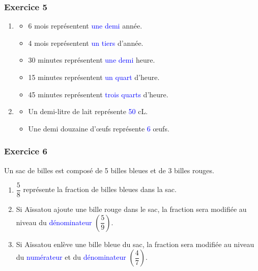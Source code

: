\documentclass[xcolor={dvipsnames}]{beamer}
\begin{document}
\begin{frame}
	\frametitle{Exercice 5}
	\begin{enumerate}[a]
		\item \begin{itemize}
			\item {\Large 6 mois représentent \pause \textcolor{blue}{une demi} année.}
			\item {\Large 4 mois représentent \pause \textcolor{blue}{un tiers} d'année.}
			\item {\Large 30 minutes représentent \pause \textcolor{blue}{une demi} heure.}
			\item {\Large 15 minutes représentent \pause \textcolor{blue}{un quart} d'heure.}
			\item {\Large  45 minutes représentent \pause \textcolor{blue}{trois quarts} d'heure.}
		\end{itemize}
		
		\vspace*{2cm}
		
		\item \begin{itemize}
			\item {\Large Un demi-litre de lait représente \pause \textcolor{blue}{50} cL.}
			\item {\Large Une demi douzaine d'\oe ufs représente \pause \textcolor{blue}{6} \oe ufs.}
		\end{itemize}
	\end{enumerate}
\end{frame}

\begin{frame}
	\frametitle{Exercice 6}
	
	Un sac de billes est composé de 5 billes bleues et de 3 billes rouges.
	
	\begin{enumerate}[a]
		\item  $\dfrac{5}{8}$ représente \pause la fraction de billes bleues dans la sac.
		
		\item Si Aïssatou ajoute une bille rouge dans le sac, la fraction sera modifiée au niveau \pause du \textcolor{blue}{dénominateur} $ \left(  \dfrac{5}{9} \right) $.
		
		
		\item Si Aïssatou enlève une bille bleue du sac, la fraction sera modifiée au niveau \pause du \textcolor{blue}{numérateur} et du  \textcolor{blue}{dénominateur} $ \left( \dfrac{4}{7} \right) $.
	\end{enumerate}
 \end{frame}
\end{document}
